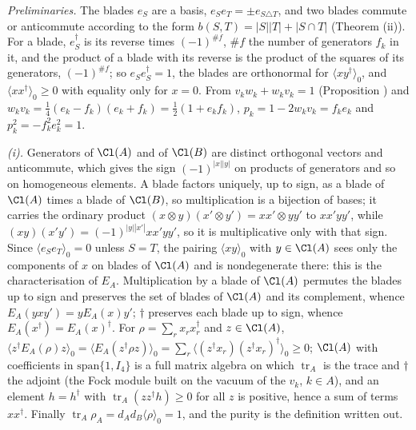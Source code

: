 \emph{Preliminaries.} The blades $e_{S}$ are a basis, $e_{S}e_{T} = \pm e_{S \triangle T}$, and two blades commute or anticommute according to the form $b(S,T) = |S||T| + |S \cap T|$ (Theorem (ii)). For a blade, $e_{S}^{\dagger}$ is its reverse times $(-1)^{\#f}$, $\#f$ the number of generators $f_{k}$ in it, and the product of a blade with its reverse is the product of the squares of its generators, $(-1)^{\#f}$; so $e_{S}e_{S}^{\dagger} = 1$, the blades are orthonormal for $\langle xy^{\dagger}\rangle_{0}$, and $\langle xx^{\dagger}\rangle_{0} \ge 0$ with equality only for $x = 0$. From $v_{k}w_{k} + w_{k}v_{k} = 1$ (Proposition ) and $w_{k}v_{k} = \tfrac14(e_{k} - f_{k})(e_{k} + f_{k}) = \tfrac12(1 + e_{k}f_{k})$, $p_{k} = 1 - 2w_{k}v_{k} = f_{k}e_{k}$ and $p_{k}^{2} = -f_{k}^{2}e_{k}^{2} = 1$.

\emph{(i).} Generators of $\Cl(A)$ and of $\Cl(B)$ are distinct orthogonal vectors and anticommute, which gives the sign $(-1)^{|x||y|}$ on products of generators and so on homogeneous elements. A blade factors uniquely, up to sign, as a blade of $\Cl(A)$ times a blade of $\Cl(B)$, so multiplication is a bijection of bases; it carries the ordinary product $(x \otimes y)(x' \otimes y') = xx' \otimes yy'$ to $xx'yy'$, while $(xy)(x'y') = (-1)^{|y||x'|}xx'yy'$, so it is multiplicative only with that sign. Since $\langle e_{S}e_{T}\rangle_{0} = 0$ unless $S = T$, the pairing $\langle xy\rangle_{0}$ with $y \in \Cl(A)$ sees only the components of $x$ on blades of $\Cl(A)$ and is nondegenerate there: this is the characterisation of $E_{A}$. Multiplication by a blade of $\Cl(A)$ permutes the blades up to sign and preserves the set of blades of $\Cl(A)$ and its complement, whence $E_{A}(yxy') = yE_{A}(x)y'$; $\dagger$ preserves each blade up to sign, whence $E_{A}(x^{\dagger}) = E_{A}(x)^{\dagger}$. For $\rho = \sum_{r}x_{r}x_{r}^{\dagger}$ and $z \in \Cl(A)$, $\langle z^{\dagger}E_{A}(\rho)z\rangle_{0} = \langle E_{A}(z^{\dagger}\rho z)\rangle_{0} = \sum_{r}\langle(z^{\dagger}x_{r})(z^{\dagger}x_{r})^{\dagger}\rangle_{0} \ge 0$; $\Cl(A)$ with coefficients in $\mathrm{span}\{1, I_{4}\}$ is a full matrix algebra on which $\operatorname{tr}_{A}$ is the trace and $\dagger$ the adjoint (the Fock module built on the vacuum of the $v_{k}$, $k \in A$), and an element $h = h^{\dagger}$ with $\operatorname{tr}_{A}(zz^{\dagger}h) \ge 0$ for all $z$ is positive, hence a sum of terms $xx^{\dagger}$. Finally $\operatorname{tr}_{A}\rho_{A} = d_{A}d_{B}\langle\rho\rangle_{0} = 1$, and the purity is the definition written out.


